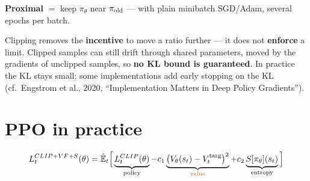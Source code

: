 \begin{center}
\end{center}

\textbf{Proximal} $=$ keep $\pi_\theta$ near $\pi_{\mathrm{old}}$ --- with plain minibatch SGD/Adam, several epochs per batch.

\begin{warnbox}[title={Clipping is an incentive, not a limit}]
Clipping removes the \textbf{incentive} to move a ratio further --- it does not \textbf{enforce} a limit. Clipped samples can still drift through shared parameters, moved by the gradients of unclipped samples, so \textbf{no KL bound is guaranteed}. In practice the KL stays small; some implementations add early stopping on the KL (cf.\ Engstrom et al., 2020, ``Implementation Matters in Deep Policy Gradients'').
\end{warnbox}

\section{PPO in practice}

\begin{eqbox}
\begin{gather*}
  L_t^{CLIP+VF+S}(\theta) = \hat\E_t\Big[\underbrace{L_t^{CLIP}(\theta)}_{\text{policy}}
    - c_1\underbrace{\big(V_\theta(s_t)-V_t^{\mathrm{targ}}\big)^2}_{\text{\color{AtlasWarm}value}}
    + c_2\underbrace{S[\pi_\theta](s_t)}_{\text{entropy}}\Big]
\end{gather*}
\end{eqbox}

